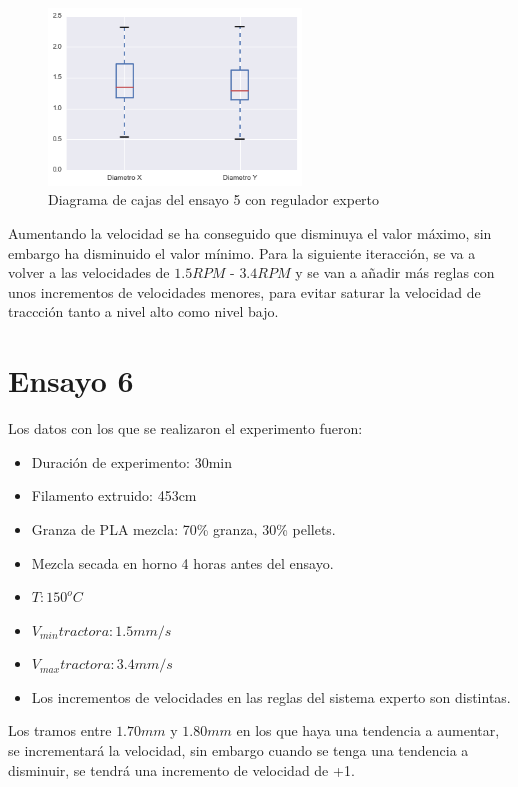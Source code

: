 \begin{figure}[H]
    \centering
    \includegraphics[width=0.6\textwidth]{images/producciones/13082015/output_10_e2.png}
    \caption{Diagrama de cajas del ensayo 5 con regulador experto}
    \label{fig:reg_cajas5}
\end{figure}

Aumentando la velocidad se ha conseguido que disminuya el valor máximo, sin embargo ha disminuido el valor mínimo. Para la siguiente iteracción, se va a volver a las velocidades de $1.5RPM$ - $3.4RPM$ y se van a añadir más reglas con unos incrementos de velocidades menores, para evitar saturar la velocidad de traccción tanto a nivel alto como nivel bajo.

\section{Ensayo 6}

Los datos con los que se realizaron el experimento fueron:

\begin{itemize}
	\item{Duración de experimento: 30min}
	\item{Filamento extruido: 453cm}
	\item{Granza de PLA mezcla: 70\% granza, 30\% pellets.}
	\item{Mezcla secada en horno 4 horas antes del ensayo.}
	\item{$T: 150^oC$}
	\item{$V_{min} tractora: 1.5 mm/s$}
	\item{$V_{max} tractora: 3.4 mm/s$}
	\item{Los incrementos de velocidades en las reglas del sistema experto son distintas.}
\end{itemize}

 Los tramos entre $1.70 mm$ y $1.80mm$ en los que haya una tendencia a aumentar, se incrementará la velocidad, sin embargo cuando se tenga una tendencia a disminuir, se tendrá una incremento de velocidad de +1.\\

